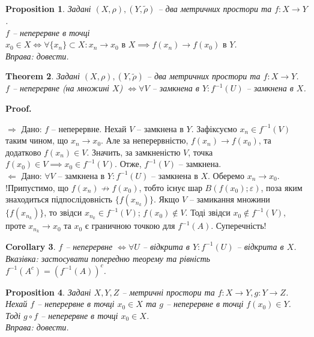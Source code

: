 \documentclass[a4paper, 10pt]{article}
\makeatletter
\def\rightproof{$\boxed{\Rightarrow}$ }
\def\leftproof{$\boxed{\Leftarrow}$ }
\theoremstyle{theoremdd}
\newtheorem{theorem}{Theorem}[subsection]
\theoremstyle{theoremdd}
\theoremstyle{theoremdd}
\theoremstyle{theoremdd}
\theoremstyle{theoremdd}
\newtheorem{proposition}[theorem]{Proposition}
\theoremstyle{theoremdd}
\theoremstyle{theoremdd}
\theoremstyle{theoremdd}
\newtheorem{corollary}[theorem]{Corollary}
\renewenvironment{proof}[1][Proof.\\]{\par
\pushQED{\hfill \qed}%
\normalfont \topsep6\p@\@plus6\p@\relax
\trivlist
\item\relax
{\bfseries
#1\@addpunct{.}}\hspace\labelsep\ignorespaces
}{%
\popQED\endtrivlist\@endpefalse
}
\makeatother
\begin{document}
\begin{proposition}
Задані $(X,\rho), (Y,\tilde{\rho})$ -- два метричних простори та $f \colon X \to Y$.\\
$f$ -- неперервне в точці $x_0 \in X \iff \forall \{x_n\} \subset X: x_n \to x_0 \text{ в } X \implies f(x_n) \to f(x_0) \text{ в } Y$.\\
\textit{Вправа: довести.}
\end{proposition}

\begin{theorem}
Задані $(X,\rho), (Y,\tilde{\rho})$ -- два метричних простори та $f \colon X \to Y$.\\
$f$ -- неперервне (на множині $X$) $\iff \forall V$ -- замкнена в $Y: f^{-1}(U)$ -- замкнена в $X$.
\end{theorem}

\begin{proof}
\rightproof Дано: $f$ -- неперервне. Нехай $V$ -- замкнена в $Y$. Зафіксуємо $x_n \in f^{-1}(V)$ таким чином, що $x_n \to x_0$. Але за неперервністю, $f(x_n) \to f(x_0)$, та додатково $f(x_n) \in V$. Значить, за замкненістю $V$, точка $f(x_0) \in V \implies x_0 \in f^{-1}(V)$. Отже, $f^{-1}(V)$ -- замкнена.
\bigskip \\
\leftproof Дано: $\forall V$ -- замкнена в $Y: f^{-1}(U)$ -- замкнена в $X$. Оберемо $x_n \to x_0$.\\
!Припустимо, що $f(x_n) \not\to f(x_0)$, тобто існує шар $B(f(x_0);\varepsilon)$, поза яким знаходиться підпослідовність $\{f(x_{n_k})\}$. Якщо $V$ -- замикання множини $\{f(x_{n_k})\}$, то звідси $x_{n_k} \in f^{-1}(V)$; $f(x_0) \notin V$. Тоді звідси $x_0 \notin f^{-1}(V)$, проте $x_{n_k} \to x_0$ та $x_0$ є граничною точкою для $f^{-1}(A)$. Суперечність!
\end{proof}

\begin{corollary}
$f$ -- неперервне $\iff \forall U$ -- відкрита в $Y: f^{-1}(U)$ -- відкрита в $X$.\\
\textit{Вказівка: застосувати попередню теорему та рівність $f^{-1}(A^c) = (f^{-1}(A))^c$.}
\end{corollary}

\begin{proposition}
Задані $X,Y,Z$ -- метричні простори та $f \colon X \to Y, g \colon Y \to Z$. Нехай $f$ -- неперервне в точці $x_0 \in X$ та $g$ -- неперервне в точці $f(x_0) \in Y$. Тоді $g \circ f$ -- неперервне в точці $x_0 \in X$.\\
\textit{Вправа: довести.}
\end{proposition}
\end{document}
